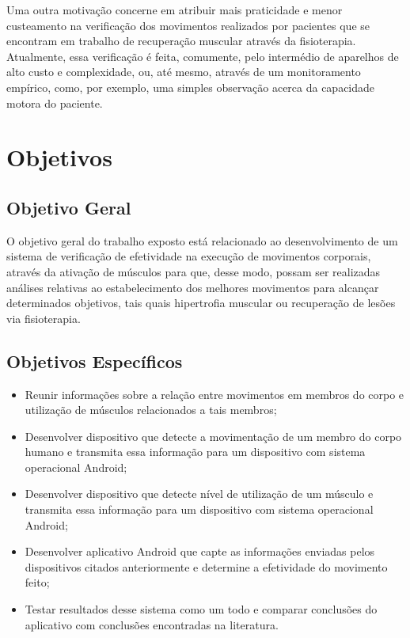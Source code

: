     Uma outra motivação concerne em atribuir mais praticidade e menor custeamento na verificação dos movimentos realizados por pacientes que se encontram em trabalho de recuperação muscular através da fisioterapia. Atualmente, essa verificação é feita, comumente, pelo intermédio de aparelhos de alto custo e complexidade, ou, até mesmo, através de um monitoramento empírico, como, por exemplo, uma simples observação acerca da capacidade motora do paciente.
    
    
    

\section{Objetivos}

    \subsection{Objetivo Geral}
    O objetivo geral do trabalho exposto está relacionado ao desenvolvimento de um sistema de verificação de efetividade na execução de movimentos corporais, através da ativação de músculos para que, desse modo, possam ser realizadas análises relativas ao estabelecimento dos melhores movimentos para alcançar determinados objetivos, tais quais hipertrofia muscular ou recuperação de lesões via fisioterapia.
    
    
    \subsection{Objetivos Específicos}
        \begin{itemize}
        \item Reunir informações sobre a relação entre movimentos em membros do corpo e utilização de músculos relacionados a tais membros;
        \item Desenvolver dispositivo que detecte a movimentação de um membro do corpo humano e transmita essa informação para um dispositivo com sistema operacional Android;
        \item Desenvolver dispositivo que detecte nível de utilização de um músculo e transmita essa informação para um dispositivo com sistema operacional Android;
        \item Desenvolver aplicativo Android que capte as informações enviadas pelos dispositivos citados anteriormente e determine a efetividade do movimento feito;
        \item Testar resultados desse sistema como um todo e comparar conclusões do aplicativo com conclusões encontradas na literatura.
        \end{itemize}


